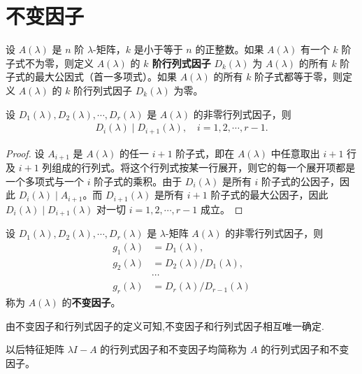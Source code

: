 \documentclass[../../main.tex]{subfiles}
\begin{document}
\section{不变因子}

\begin{definition}[$k$阶行列式因子]
设 $A(\lambda)$ 是 $n$ 阶 $\lambda$-矩阵，$k$ 是小于等于 $n$ 的正整数。如果 $A(\lambda)$ 有一个 $k$ 阶子式不为零，则定义 $A(\lambda)$ 的 \textbf{$k$ 阶行列式因子} $D_k(\lambda)$ 为 $A(\lambda)$ 的所有 $k$ 阶子式的最大公因式（首一多项式）。如果 $A(\lambda)$ 的所有 $k$ 阶子式都等于零，则定义 $A(\lambda)$ 的 $k$ 阶行列式因子 $D_k(\lambda)$ 为零。 
\end{definition}

\begin{lemma}\label{lemma:i阶行列式因子整除i+1阶行列式因子}
设 $D_1(\lambda), D_2(\lambda), \cdots, D_r(\lambda)$ 是 $A(\lambda)$ 的非零行列式因子，则
\begin{align*}
D_i(\lambda)\mid D_{i + 1}(\lambda),\quad i = 1, 2, \cdots, r - 1.
\end{align*}
\end{lemma}
\begin{proof}
设 $A_{i + 1}$ 是 $A(\lambda)$ 的任一 $i + 1$ 阶子式，即在 $A(\lambda)$ 中任意取出 $i + 1$ 行及 $i + 1$ 列组成的行列式。将这个行列式按某一行展开，则它的每一个展开项都是一个多项式与一个 $i$ 阶子式的乘积。由于 $D_i(\lambda)$ 是所有 $i$ 阶子式的公因子，因此 $D_i(\lambda)\mid A_{i + 1}$。而 $D_{i + 1}(\lambda)$ 是所有 $i + 1$ 阶子式的最大公因子，因此 $D_i(\lambda)\mid D_{i + 1}(\lambda)$ 对一切 $i = 1, 2, \cdots, r - 1$ 成立。 
\end{proof}

\begin{definition}[不变因子]
设 $D_1(\lambda), D_2(\lambda), \cdots, D_r(\lambda)$ 是 $\lambda$-矩阵 $A(\lambda)$ 的非零行列式因子，则
\begin{align*}
g_1(\lambda)&=D_1(\lambda),\\
g_2(\lambda)&=D_2(\lambda)/D_1(\lambda),\\
&\cdots\\
g_r(\lambda)&=D_r(\lambda)/D_{r - 1}(\lambda)
\end{align*}
称为 $A(\lambda)$ 的\textbf{不变因子}。 
\end{definition}
\begin{note}
由不变因子和行列式因子的定义可知,不变因子和行列式因子相互唯一确定.
\end{note}
\begin{remark}
以后特征矩阵 $\lambda I - A$ 的行列式因子和不变因子均简称为 $A$ 的行列式因子和不变因子。 
\end{remark}
\end{document}
